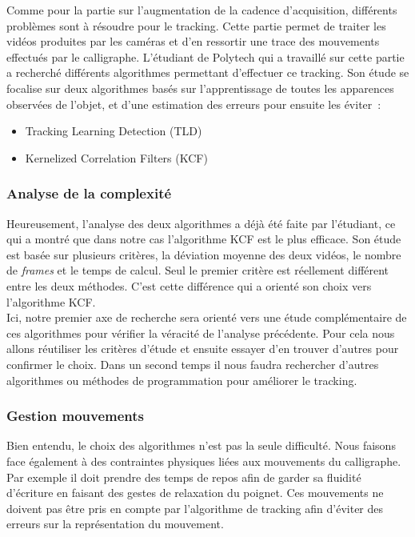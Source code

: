 Comme pour la partie sur l'augmentation de la cadence d'acqui\-si\-tion, dif\-fé\-rents problèmes sont à résoudre pour le tracking. Cette partie permet de traiter les vidéos produites par les caméras et d'en ressortir une trace des mouvements effectués par le calligraphe. L'étudiant de Polytech qui a travaillé sur cette partie a recherché différents algorithmes permettant d'effectuer ce tracking. Son étude se focalise sur deux algorithmes basés sur l'apprentissage de toutes les apparences observées de l'objet, et d'une estimation des erreurs pour ensuite les éviter~:

\begin{itemize}

\item Tracking Learning Detection (TLD)

\item Kernelized Correlation Filters (KCF)

\end{itemize}

  
\subsubsection{Analyse de la complexité}

Heureusement, l'analyse des deux al\-go\-ri\-thmes a déjà été faite par l'é\-tu\-diant, ce qui a montré que dans notre cas l'al\-go\-ri\-thme KCF est le plus ef\-fi\-ca\-ce. Son étude est basée sur plusieurs critères, la déviation moyenne des deux vidéos, le nombre de \textit{frames} et le temps de calcul. Seul le premier critère est ré\-el\-le\-ment différent entre les deux méthodes. C'est cette différence qui a orienté son choix vers l'algorithme KCF. \\

Ici, notre premier axe de recherche sera orienté vers une étude com\-plé\-men\-tai\-re de ces algorithmes pour vérifier la véracité de l'analyse précédente. Pour cela nous allons réutiliser les critères d'étude et ensuite essayer d'en trouver d'autres pour confirmer le choix. Dans un second temps il nous faudra rechercher d'autres algorithmes ou méthodes de programmation pour améliorer le tracking.

\subsubsection{Gestion mouvements}

Bien entendu, le choix des algorithmes n'est pas la seule difficulté. Nous faisons face également à des contraintes physiques liées aux mouvements du calligraphe. Par exemple il doit prendre des temps de repos afin de garder sa fluidité d'écriture en faisant des gestes de relaxation du poignet. Ces mouvements ne doivent pas être pris en compte par l'algorithme de tracking afin d'éviter des erreurs sur la représentation du mouvement. \\

